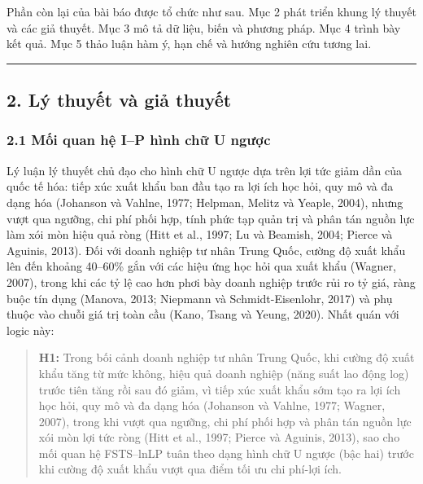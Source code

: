 \documentclass[12pt,a4paper]{article}
\begin{document}
Phần còn lại của bài báo được tổ chức như sau. Mục 2 phát triển khung lý
thuyết và các giả thuyết. Mục 3 mô tả dữ liệu, biến và phương pháp. Mục
4 trình bày kết quả. Mục 5 thảo luận hàm ý, hạn chế và hướng nghiên cứu
tương lai.

\begin{center}\rule{0.5\linewidth}{0.5pt}\end{center}

\hypertarget{2-luxfd-thuyux1ebft-vuxe0-giux1ea3-thuyux1ebft}{%
\subsection{2. Lý thuyết và giả
thuyết}\label{2-luxfd-thuyux1ebft-vuxe0-giux1ea3-thuyux1ebft}}

\hypertarget{21-mux1ed1i-quan-hux1ec7-ip-huxecnh-chux1eef-u-ngux1b0ux1ee3c}{%
\subsubsection{2.1 Mối quan hệ I--P hình chữ U
ngược}\label{21-mux1ed1i-quan-hux1ec7-ip-huxecnh-chux1eef-u-ngux1b0ux1ee3c}}

Lý luận lý thuyết chủ đạo cho hình chữ U ngược dựa trên lợi tức giảm dần
của quốc tế hóa: tiếp xúc xuất khẩu ban đầu tạo ra lợi ích học hỏi, quy
mô và đa dạng hóa (Johanson và Vahlne, 1977; Helpman, Melitz và Yeaple,
2004), nhưng vượt qua ngưỡng, chi phí phối hợp, tính phức tạp quản trị
và phân tán nguồn lực làm xói mòn hiệu quả ròng (Hitt et al., 1997; Lu
và Beamish, 2004; Pierce và Aguinis, 2013). Đối với doanh nghiệp tư nhân
Trung Quốc, cường độ xuất khẩu lên đến khoảng 40--60\% gắn với các hiệu
ứng học hỏi qua xuất khẩu (Wagner, 2007), trong khi các tỷ lệ cao hơn
phơi bày doanh nghiệp trước rủi ro tỷ giá, ràng buộc tín dụng (Manova,
2013; Niepmann và Schmidt-Eisenlohr, 2017) và phụ thuộc vào chuỗi giá
trị toàn cầu (Kano, Tsang và Yeung, 2020). Nhất quán với logic này:

\begin{quote}
\textbf{H1:} Trong bối cảnh doanh nghiệp tư nhân Trung Quốc, khi cường
độ xuất khẩu tăng từ mức không, hiệu quả doanh nghiệp (năng suất lao
động log) trước tiên tăng rồi sau đó giảm, vì tiếp xúc xuất khẩu sớm tạo
ra lợi ích học hỏi, quy mô và đa dạng hóa (Johanson và Vahlne, 1977;
Wagner, 2007), trong khi vượt qua ngưỡng, chi phí phối hợp và phân tán
nguồn lực xói mòn lợi tức ròng (Hitt et al., 1997; Pierce và Aguinis,
2013), sao cho mối quan hệ FSTS--lnLP tuân theo dạng hình chữ U ngược
(bậc hai) trước khi cường độ xuất khẩu vượt qua điểm tối ưu chi phí-lợi
ích.
\end{quote}
\end{document}

